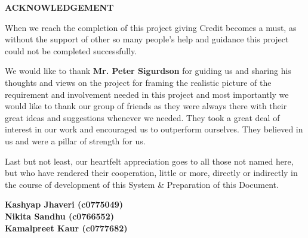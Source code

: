 \begin{titlepage}
    \begin{center}
        \vspace*{2cm}
        \huge
        \textbf{ACKNOWLEDGEMENT}
    \end{center}
    
    \vspace{1cm}
    \Large When we reach the completion of this project giving Credit becomes a must, as without the support of other so many people's help and guidance this project could not be completed successfully.

    \vspace{1cm}
    \Large We would like to thank \textbf{Mr. Peter Sigurdson} for guiding us and sharing his thoughts and views on the project for framing the realistic picture of the requirement and involvement needed in this project and most importantly we would like to thank our group of friends as they were always there with their great ideas and suggestions whenever we needed. They took a great deal of interest in our work and encouraged us to outperform ourselves. They believed in us and were a pillar of strength for us.

    \vspace{1cm}
    \Large Last but not least, our heartfelt appreciation goes to all those not named here, but who have rendered their cooperation, little or more, directly or indirectly in the course of development of this System \& Preparation of this Document.
        
    \vspace{1cm}
    \begin{flushright}
        \textbf{Kashyap Jhaveri (c0775049)
		\\Nikita Sandhu (c0766552)
		\\Kamalpreet  Kaur (c0777682)} 
    \end{flushright}
    
\end{titlepage}